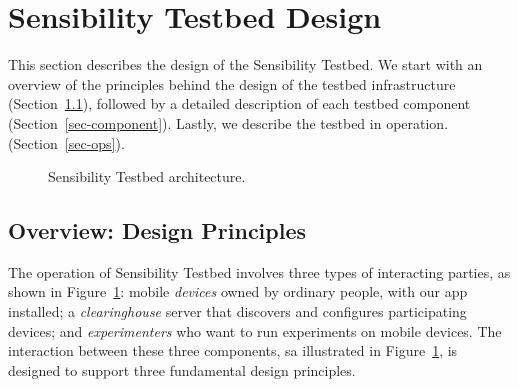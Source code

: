 \section{Sensibility Testbed Design}\label{sec-design}

This section describes the design of the Sensibility Testbed. 
We start with an overview of the principles behind the design of 
the testbed infrastructure (Section~\ref{sec-overview}), 
followed by a detailed description of each testbed component 
(Section~\ref{sec-component}). Lastly, we describe the testbed in operation.
 (Section~\ref{sec-ops}).

\begin{figure}
\caption{\small Sensibility Testbed architecture. \label{fig-arch}}
\end{figure}

\subsection{Overview: Design Principles}\label{sec-overview}

The operation of Sensibility Testbed  involves three types of interacting
parties, as shown in Figure~\ref{fig-arch}: mobile \textit{devices} 
owned by ordinary people, with our app installed; a 
\textit{clearinghouse} server that discovers and configures
participating devices; and \textit{experimenters} who want to run
experiments on mobile devices. The interaction between these three 
components, sa illustrated in Figure~\ref{fig-arch}, is designed to 
support three fundamental design principles.

